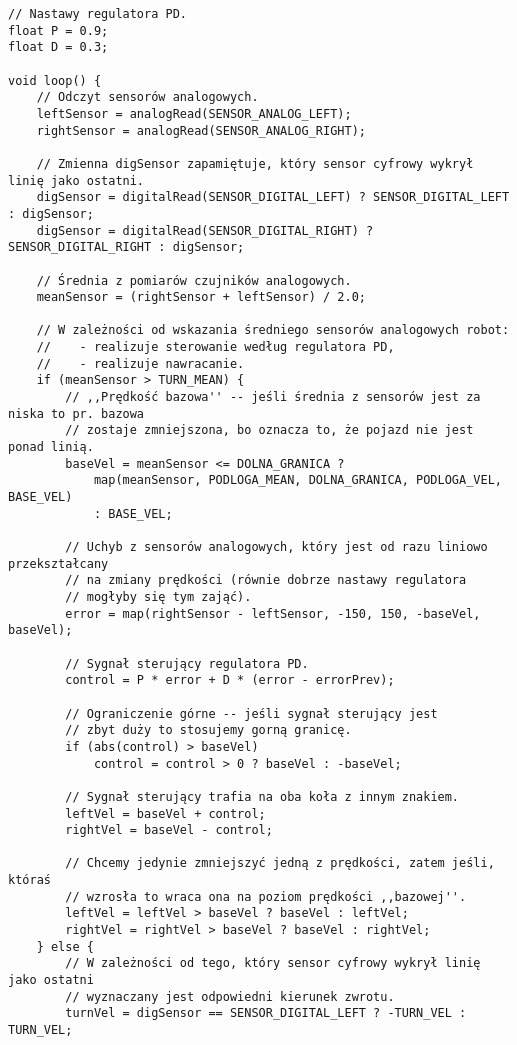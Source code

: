 \documentclass[11pt]{article}
\begin{document}
\begin{appendices}
\begin{lstlisting}[basicstyle = \ttfamily \footnotesize]
// Nastawy regulatora PD.
float P = 0.9;
float D = 0.3;

void loop() {
    // Odczyt sensorów analogowych.
    leftSensor = analogRead(SENSOR_ANALOG_LEFT);
    rightSensor = analogRead(SENSOR_ANALOG_RIGHT);

    // Zmienna digSensor zapamiętuje, który sensor cyfrowy wykrył linię jako ostatni.
    digSensor = digitalRead(SENSOR_DIGITAL_LEFT) ? SENSOR_DIGITAL_LEFT : digSensor;
    digSensor = digitalRead(SENSOR_DIGITAL_RIGHT) ? SENSOR_DIGITAL_RIGHT : digSensor;

    // Średnia z pomiarów czujników analogowych.
    meanSensor = (rightSensor + leftSensor) / 2.0;
        
    // W zależności od wskazania średniego sensorów analogowych robot:
    //    - realizuje sterowanie według regulatora PD,
    //    - realizuje nawracanie.
    if (meanSensor > TURN_MEAN) {
        // ,,Prędkość bazowa'' -- jeśli średnia z sensorów jest za niska to pr. bazowa 
        // zostaje zmniejszona, bo oznacza to, że pojazd nie jest ponad linią.
        baseVel = meanSensor <= DOLNA_GRANICA ?
            map(meanSensor, PODLOGA_MEAN, DOLNA_GRANICA, PODLOGA_VEL, BASE_VEL)
            : BASE_VEL;
    
        // Uchyb z sensorów analogowych, który jest od razu liniowo przekształcany
        // na zmiany prędkości (równie dobrze nastawy regulatora
        // mogłyby się tym zająć).
        error = map(rightSensor - leftSensor, -150, 150, -baseVel, baseVel);
    
        // Sygnał sterujący regulatora PD.
        control = P * error + D * (error - errorPrev);
    
        // Ograniczenie górne -- jeśli sygnał sterujący jest
        // zbyt duży to stosujemy gorną granicę.
        if (abs(control) > baseVel)
            control = control > 0 ? baseVel : -baseVel;
    
        // Sygnał sterujący trafia na oba koła z innym znakiem.
        leftVel = baseVel + control;
        rightVel = baseVel - control;
    
        // Chcemy jedynie zmniejszyć jedną z prędkości, zatem jeśli, któraś
        // wzrosła to wraca ona na poziom prędkości ,,bazowej''.
        leftVel = leftVel > baseVel ? baseVel : leftVel;
        rightVel = rightVel > baseVel ? baseVel : rightVel;
    } else {
        // W zależności od tego, który sensor cyfrowy wykrył linię jako ostatni
        // wyznaczany jest odpowiedni kierunek zwrotu.
        turnVel = digSensor == SENSOR_DIGITAL_LEFT ? -TURN_VEL : TURN_VEL;


\end{lstlisting}
\end{appendices}
\end{document}

